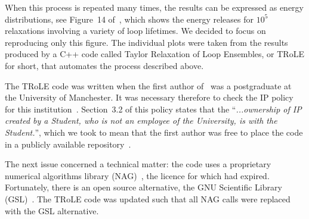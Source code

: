 When this process is repeated many times, the results can be expressed as energy distributions, see Figure~14 of~\cite{bareford2010nanoflare}, which shows the energy releases for $10^5$ relaxations involving a variety of loop lifetimes. We decided to focus on reproducing only this figure. The individual plots were taken from the results produced by a C++ code called Taylor Relaxation of Loop Ensembles, or TRoLE for short, that automates the process described above.

The TRoLE code was written when the first author of~\cite{bareford2010nanoflare}
was a postgraduate at the University of Manchester. It was necessary therefore
to check the IP policy for this
institution~\cite{manchester:ipr}.
Section~3.2 of this policy states that the ``\emph{...ownership of IP created by
a Student, who is not an employee of the University, is with the Student.}'',
which we took to mean that the first author was free to place the code in a
publicly available
repository~\cite{trole}.

The next issue concerned a technical matter: the code uses
a proprietary numerical algorithms library
(NAG)~\cite{nag}, the 
licence for which had expired. Fortunately, there is an open source alternative,
the GNU Scientific Library
(GSL)~\cite{gsl}. The TRoLE code was updated such that all NAG calls were replaced with the GSL alternative. 

% 

